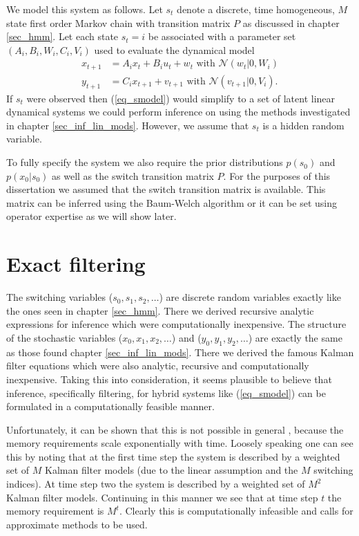 We model this system as follows. Let $s_t$ denote a discrete, time homogeneous, $M$ state first order Markov chain with transition matrix $P$ as discussed in chapter \ref{sec_hmm}. Let each state $s_t=i$ be associated with a parameter set $\left(A_i, B_i, W_i, C_i, V_i \right)$ used to evaluate the dynamical model 
\begin{equation}
\begin{aligned}
x_{t+1} &= A_ix_t + B_iu_t + w_{t} \text{ with } \mathcal{N}(w_{t}|0,W_i) \\
y_{t+1} &= C_ix_{t+1} + v_{t+1}  \text{ with } \mathcal{N}(v_{t+1}|0,V_i).
\end{aligned}
\label{eq_smodel}
\end{equation}
If $s_t$ were observed then (\ref{eq_smodel}) would simplify to a set of latent linear dynamical systems we could perform inference on using the methods investigated in chapter \ref{sec_inf_lin_mods}. However, we assume that $s_t$ is a hidden random variable.

To fully specify the system we also require the prior distributions $p(s_0)$ and $p(x_0|s_0)$ as well as the switch transition matrix $P$. For the purposes of this dissertation we assumed that the switch transition matrix is available. This matrix can be inferred using the Baum-Welch algorithm \cite{murphy1} or it can be set using operator expertise as we will show later.

\section{Exact filtering}
The switching variables ($s_0, s_1, s_2,\hdots$) are discrete random variables exactly like the ones seen in chapter \ref{sec_hmm}. There we derived recursive analytic expressions for inference which were computationally inexpensive. The structure of the stochastic variables ($x_0, x_1,x_2,\hdots$) and ($y_0,y_1, y_2,\hdots$) are exactly the same as those found chapter \ref{sec_inf_lin_mods}. There we derived the famous Kalman filter equations which were also analytic, recursive and computationally inexpensive. Taking this into consideration, it seems plausible to believe that inference, specifically filtering, for hybrid systems like (\ref{eq_smodel}) can be formulated in a computationally feasible manner. 

Unfortunately, it can be shown that this is not possible in general \cite{lerner}, \cite{murphy3} because the memory requirements scale exponentially with time. Loosely speaking one can see this by noting that at the first time step the system is described by a weighted set of $M$ Kalman filter models (due to the linear assumption and the $M$ switching indices). At time step two the system is described by a weighted set of $M^2$ Kalman filter models. Continuing in this manner we see that at time step $t$ the memory requirement is $M^t$. Clearly this is computationally infeasible and calls for approximate methods to be used. 

